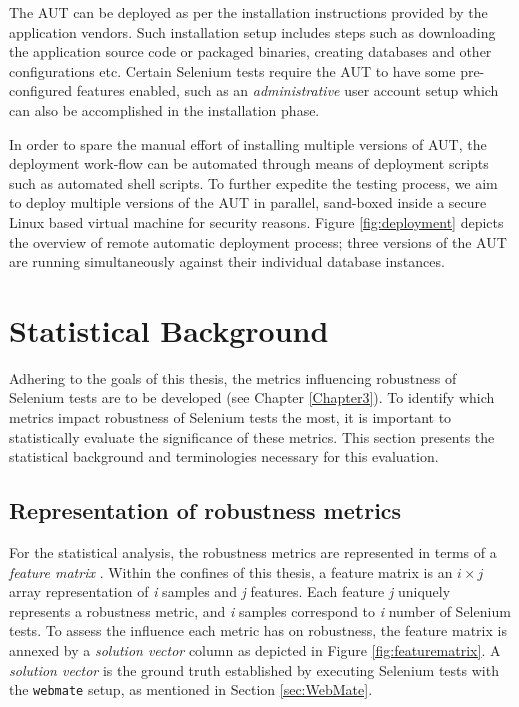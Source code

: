 The AUT can be deployed as per the installation instructions provided by the application vendors. Such installation setup includes steps such as downloading the application source code or packaged binaries, creating databases and other configurations etc. Certain Selenium tests require the AUT to have some pre-configured features enabled, such as an \textit{administrative} user account setup which can also be accomplished in the installation phase. 

In order to spare the manual effort of installing multiple versions of AUT, the deployment work-flow can be automated through means of deployment scripts such as automated shell scripts. To further expedite the testing process, we aim to deploy multiple versions of the AUT in parallel, sand-boxed inside a secure Linux based virtual machine for security reasons. Figure \ref{fig:deployment} depicts the overview of remote automatic deployment process; three versions of the AUT are running simultaneously against their individual database instances.


\section{Statistical Background}
\label{sec:Statistical}
Adhering to the goals of this thesis, the metrics influencing robustness of Selenium tests are to be developed (see Chapter \ref{Chapter3}). To identify which metrics impact robustness of Selenium tests the most, it is important to statistically evaluate the significance of these metrics. This section presents the statistical background and terminologies necessary for this evaluation.

\subsection*{Representation of robustness metrics}
For the statistical analysis, the robustness metrics are represented in terms of a \textit{feature matrix} \cite{li2005lasso}. Within the confines of this thesis, a feature matrix is an $i\times j$ array representation of \textit{i} samples and \textit{j} features. Each feature \textit{j} uniquely represents a robustness metric, and  
\textit{i} samples correspond to \textit{i} number of Selenium tests. To assess the influence each metric has on robustness, the feature matrix is annexed by a \textit{solution vector} column as depicted in Figure \ref{fig:featurematrix}. A \textit{solution vector} is the ground truth established by executing Selenium tests with the \texttt{webmate} setup, as mentioned in Section \ref{sec:WebMate}.

